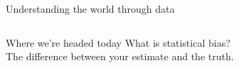 \documentclass[aspectratio=169]{../latex_main/tntbeamer}  %
\begin{document}
\begin{frame}{Understanding the world through data}
\begin{columns}
\begin{column}{.4\textwidth}
        
        \end{column}
        
        
        \end{columns}
        
    \end{frame}



     \begin{frame}[c]{Where we’re headed today}
       \hspace{3cm} What is statistical bias?\\
        \hspace{5cm} The difference between your estimate and the truth.

        
    \end{frame}
\end{document}
